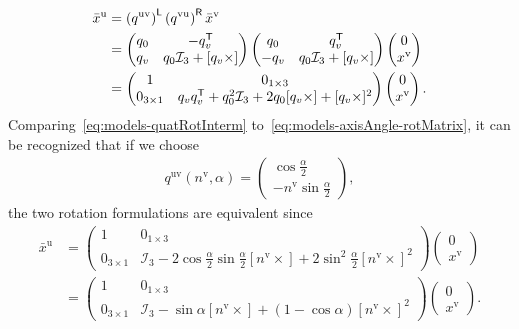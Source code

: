 \begin{align}
\label{eq:models-quatRotInterm}
\bar x^\text{u} &= \left( q^\text{uv} \right)^{\mathsf{L}} \left( q^\text{vu} \right)^{\mathsf{R}} \bar x^\text{v} \nonumber \\
&= \begin{pmatrix} q_0 & -q_v^{\mathsf{T}} \\ q_v & q_0 \mathcal{I}_3 + [q_v \times] \end{pmatrix} \begin{pmatrix} q_0 & q_v^{\mathsf{T}} \\ -q_v & q_0 \mathcal{I}_3 + [q_v \times] \end{pmatrix} \begin{pmatrix} 0 \\ x^\text{v} \end{pmatrix} \nonumber \\
&= \begin{pmatrix} 1 & 0_{1 \times 3} \\ 0_{3 \times 1} & q_v q_v^{\mathsf{T}} + q_0^2 \mathcal{I}_3 + 2 q_0 [q_v \times] + [q_v \times]^2 \end{pmatrix} \begin{pmatrix} 0 \\ x^\text{v} \end{pmatrix}.
\end{align}
Comparing~\eqref{eq:models-quatRotInterm} to~\eqref{eq:models-axisAngle-rotMatrix}, it can be recognized that if we choose 
\begin{align}
\label{eq:models-axisAngle-quat}
q^\text{uv}(n^\text{v},\alpha) = \begin{pmatrix} \cos \tfrac{\alpha}{2} \\ - n^\text{v} \sin \tfrac{\alpha}{2} \end{pmatrix}, 
\end{align}
the two rotation formulations are equivalent since
\begin{align}
\bar x^\text{u} &= \begin{pmatrix} 1 & 0_{1 \times 3} \\ 0_{3 \times 1} & \mathcal{I}_3 - 2 \cos \tfrac{\alpha}{2} \sin \tfrac{\alpha}{2} [n^\text{v} \times] + 2 \sin^2 \tfrac{\alpha}{2} [n^\text{v} \times]^2 \end{pmatrix} \begin{pmatrix} 0 \\ x^\text{v} \end{pmatrix} \nonumber \\
&= \begin{pmatrix} 1 & 0_{1 \times 3} \\ 0_{3 \times 1} & \mathcal{I}_3 - \sin \alpha [n^\text{v} \times] + \left( 1 - \cos \alpha \right) [n^\text{v} \times]^2 \end{pmatrix} \begin{pmatrix} 0 \\ x^\text{v} \end{pmatrix}.
\end{align}
